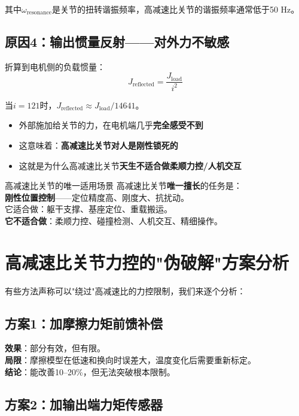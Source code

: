 其中$\omega_{\text{resonance}}$是关节的扭转谐振频率，高减速比关节的谐振频率通常低于50 Hz。

\subsection{原因4：输出惯量反射——对外力不敏感}

折算到电机侧的负载惯量：
\begin{equation}
J_{\text{reflected}} = \frac{J_{\text{load}}}{i^2}
\end{equation}

当$i=121$时，$J_{\text{reflected}} \approx J_{\text{load}} / 14641$。

\begin{itemize}
  \item 外部施加给关节的力，在电机端几乎\textbf{完全感受不到}
  \item 这意味着：\textbf{高减速比关节对人是刚性锁死的}
  \item 这就是为什么高减速比关节\textbf{天生不适合做柔顺力控/人机交互}
\end{itemize}

\begin{engineeringbox}{高减速比关节的唯一适用场景}
高减速比关节\textbf{唯一擅长}的任务是：\\
\textbf{刚性位置控制}——定位精度高、刚度大、抗扰动。\\
它适合做：躯干支撑、基座定位、重载搬运。\\
\textbf{它不适合做}：柔顺力控、碰撞检测、人机交互、精细操作。
\end{engineeringbox}

\section{高减速比关节力控的"伪破解"方案分析}

有些方法声称可以"绕过"高减速比的力控限制，我们来逐个分析：

\subsection{方案1：加摩擦力矩前馈补偿}

\textbf{效果}：部分有效，但有限。\\
\textbf{局限}：摩擦模型在低速和换向时误差大，温度变化后需要重新标定。\\
\textbf{结论}：能改善10--20\%，但无法突破根本限制。

\subsection{方案2：加输出端力矩传感器}

